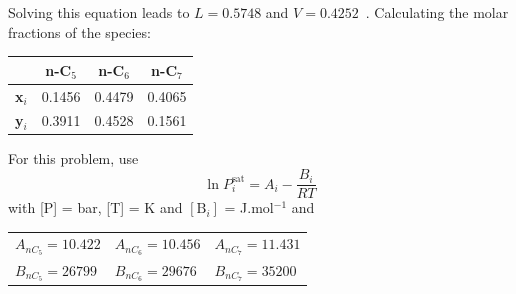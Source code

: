 \documentclass[calculator,steamtables,datasheet,solutions]{exam_newMarcus2}
\newcommand{\frc}{\displaystyle\frac}
\begin{document}
\begin{question}
{\begin{displaymath}
\end{displaymath}
Solving this equation leads to $L=0.5748$ and $V=0.4252$~. Calculating the molar fractions of the species:~
\begin{center}
\begin{tabular}{c c c c}
\hline
                 & {\bf n-C$_{5}$} &  {\bf n-C$_{6}$} &  {\bf n-C$_{7}$} \\
\hline
  {\bf x$_{i}$}   & 0.1456         &  0.4479         & 0.4065    \\
  {\bf y$_{i}$}   &  0.3911        &  0.4528         & 0.1561    \\
\hline
\end{tabular} 
\end{center}

}

For this problem, use 
\begin{displaymath}
   \ln P_{i}^{\text{sat}} = A_{i} - \frc{B_{i}}{RT}
\end{displaymath} 
with [P] = bar, [T] = K and $\left[\text{B}_{i}\right]$ = J.mol$^{-1}$ and
    \begin{center}
       \begin{tabular}{l l l} 
          $A_{nC_{5}}=10.422$ & $A_{nC_{6}}=10.456$ & $A_{nC_{7}}=11.431$ \\
          $B_{nC_{5}}=26799$  & $B_{nC_{6}}=29676$  & $B_{nC_{7}}=35200$  
       \end{tabular}
    \end{center}
%
\end{question}

\clearpage
\end{document}

